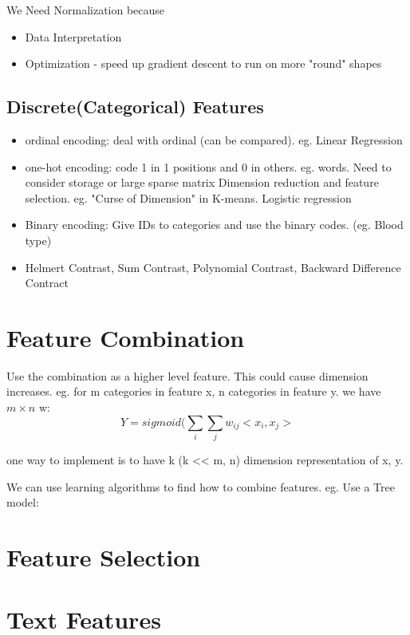 \documentclass[11pt, openany]{book}              %
\begin{document}
We Need Normalization because
\begin{itemize}
	\item Data Interpretation
	\item Optimization - speed up gradient descent to run on more "round" shapes	
\end{itemize}

\subsection{Discrete(Categorical) Features}

\begin{itemize}
	\item ordinal encoding: deal with ordinal (can be compared). eg. Linear Regression
	\item one-hot encoding: code 1 in 1 positions and 0 in others. eg. words. Need to consider
		\subitem storage or large sparse matrix
		\subitem Dimension reduction and feature selection. eg. "Curse of Dimension" in K-means. Logistic regression
	\item Binary encoding: Give IDs to categories and use the binary codes. (eg. Blood type)
	\item Helmert Contrast, Sum Contrast, Polynomial Contrast, Backward Difference Contract
\end{itemize}

\section{Feature Combination}

Use the combination as a higher level feature. This could cause dimension increases. eg. for m categories in feature x, n categories in feature y. we have $m \times n$ w:
$$Y = sigmoid(\sum_i \sum_j w_{ij} <x_i,x_j>$$

one way to implement is to have k (k << m, n) dimension representation of x, y.

We can use learning algorithms to find how to combine features. eg. Use a Tree model:


\section{Feature Selection}

\section{Text Features}
\end{document}
